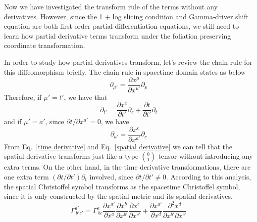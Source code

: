 \documentclass[letterpaper,nofootinbib,prd,amsmath,onecolumn]{revtex4-1}
\begin{document}
Now we have investigated the transform rule of the terms without any derivatives. However, since the 1 + log slicing condition and Gamma-driver shift equation are both first order partial differentiation equations, we still need to learn how partial derivative terms transform under the foliation preserving coordinate transformation. 

In order to study how partial derivatives transform, let's review the chain rule for this diffeomorphism briefly. The chain rule in spacetime domain states as below
\begin{equation*}
\partial_{\mu'} = \frac{\partial x^{\mu}}{\partial x^{\mu'}}\partial_{\mu}
\end{equation*}
Therefore, if $\mu' = t'$, we have that
\begin{equation}\label{time derivative}
\partial_{t'} = \frac{\partial x^{c}}{\partial t'}\partial_{c} + \frac{\partial t}{\partial t'}\partial_{t}
\end{equation}
and if $\mu' = a'$, since $\partial t/\partial x^{a'} = 0$, we have
\begin{equation}\label{spatial derivative}
\partial_{a'} = \frac{\partial x^{c}}{\partial x^{a'}}\partial_{c}
\end{equation}
From Eq.~\ref{time derivative} and Eq.~\ref{spatial derivative} we can tell that the spatial derivative transforms just like a type $0 \choose 1$ tensor without introducing any extra terms. On the other hand, in the time derivative transformations, there are one extra term $(\partial t/\partial t')\partial_{t}$ involved, since $\partial t/\partial t' \ne 0$. According to this analysis, the spatial Christoffel symbol transforms as the spacetime Christoffel symbol, since it is only constructed by the spatial metric and its spatial derivatives. 
\begin{equation}
\Gamma^{a'}_{~b'c'} = \Gamma^{a}_{~bc}\frac{\partial x^{a'}}{\partial x^{a}}\frac{\partial x^{b}}{\partial x^{b'}}\frac{\partial x^{c}}{\partial x^{c'}} + \frac{\partial x^{a'}}{\partial x^{d}}\frac{\partial^{2} x^{d}}{\partial x^{b'}\partial x^{c'}}
\end{equation}
\end{document}
